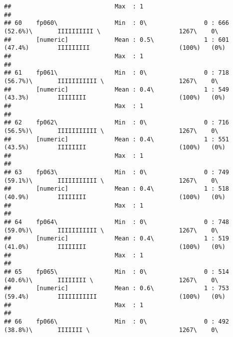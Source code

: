 \documentclass[]{article}
\begin{document}
\begin{verbatim}
##                             Max  : 1                                                                                            
## 
## 60    fp060\                Min  : 0\                0 : 666 (52.6%)\       IIIIIIIIII \                      1267\    0\       
##       [numeric]             Mean : 0.5\              1 : 601 (47.4%)        IIIIIIIII                         (100%)   (0%)     
##                             Max  : 1                                                                                            
## 
## 61    fp061\                Min  : 0\                0 : 718 (56.7%)\       IIIIIIIIIII \                     1267\    0\       
##       [numeric]             Mean : 0.4\              1 : 549 (43.3%)        IIIIIIII                          (100%)   (0%)     
##                             Max  : 1                                                                                            
## 
## 62    fp062\                Min  : 0\                0 : 716 (56.5%)\       IIIIIIIIIII \                     1267\    0\       
##       [numeric]             Mean : 0.4\              1 : 551 (43.5%)        IIIIIIII                          (100%)   (0%)     
##                             Max  : 1                                                                                            
## 
## 63    fp063\                Min  : 0\                0 : 749 (59.1%)\       IIIIIIIIIII \                     1267\    0\       
##       [numeric]             Mean : 0.4\              1 : 518 (40.9%)        IIIIIIII                          (100%)   (0%)     
##                             Max  : 1                                                                                            
## 
## 64    fp064\                Min  : 0\                0 : 748 (59.0%)\       IIIIIIIIIII \                     1267\    0\       
##       [numeric]             Mean : 0.4\              1 : 519 (41.0%)        IIIIIIII                          (100%)   (0%)     
##                             Max  : 1                                                                                            
## 
## 65    fp065\                Min  : 0\                0 : 514 (40.6%)\       IIIIIIII \                        1267\    0\       
##       [numeric]             Mean : 0.6\              1 : 753 (59.4%)        IIIIIIIIIII                       (100%)   (0%)     
##                             Max  : 1                                                                                            
## 
## 66    fp066\                Min  : 0\                0 : 492 (38.8%)\       IIIIIII \                         1267\    0\       

\end{verbatim}
\end{document}
